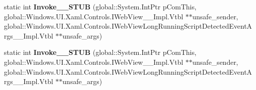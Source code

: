 \begin{DoxyCompactItemize}
\item 
\mbox{\label{struct_windows_1_1_foundation_1_1_typed_event_handler___a___windows___u_i___xaml___controls___we097668b3f317b53d2adba6098dff8aa2_a9736832796537f0a592e0db4627b256d}} 
static int {\bfseries Invoke\+\_\+\+\_\+\+S\+T\+UB} (global\+::\+System.\+Int\+Ptr p\+Com\+This, global\+::\+Windows.\+U\+I.\+Xaml.\+Controls.\+I\+Web\+View\+\_\+\+\_\+\+Impl.\+Vtbl $\ast$$\ast$unsafe\+\_\+sender, global\+::\+Windows.\+U\+I.\+Xaml.\+Controls.\+I\+Web\+View\+Long\+Running\+Script\+Detected\+Event\+Args\+\_\+\+\_\+\+Impl.\+Vtbl $\ast$$\ast$unsafe\+\_\+args)
\item 
\mbox{\label{struct_windows_1_1_foundation_1_1_typed_event_handler___a___windows___u_i___xaml___controls___we097668b3f317b53d2adba6098dff8aa2_a9736832796537f0a592e0db4627b256d}} 
static int {\bfseries Invoke\+\_\+\+\_\+\+S\+T\+UB} (global\+::\+System.\+Int\+Ptr p\+Com\+This, global\+::\+Windows.\+U\+I.\+Xaml.\+Controls.\+I\+Web\+View\+\_\+\+\_\+\+Impl.\+Vtbl $\ast$$\ast$unsafe\+\_\+sender, global\+::\+Windows.\+U\+I.\+Xaml.\+Controls.\+I\+Web\+View\+Long\+Running\+Script\+Detected\+Event\+Args\+\_\+\+\_\+\+Impl.\+Vtbl $\ast$$\ast$unsafe\+\_\+args)
\end{DoxyCompactItemize}
